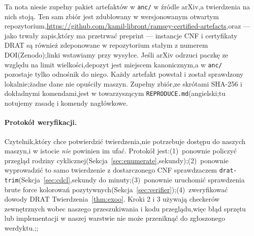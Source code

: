 \documentclass[11pt]{article}
\theoremstyle{definition}
\theoremstyle{plain}
\begin{document}
Ta nota niesie zupełny pakiet artefaktów w \texttt{anc/} w źródle arXiv,a twierdzenia na nich stoją. Ten sam zbiór jest zdublowany w wersjonowanym otwartym repozytorium,\url{https://github.com/kamil-libront/ramsey-certified-artefacts},oraz --- jako trwały zapis,który ma przetrwać preprint --- instancje CNF i certyfikaty DRAT są również zdeponowane w repozytorium stałym z numerem DOI(Zenodo);linki wstawiamy przy wysyłce. Jeśli arXiv odrzuci paczkę ze względu na limit wielkości,depozyt jest miejscem kanonicznym,a w \texttt{anc/} pozostaje tylko odnośnik do niego. Każdy artefakt powstał i został sprawdzony lokalnie;żadne dane nie opuściły maszyn. Zupełny zbiór,ze skrótami SHA-256 i dokładnymi komendami,jest w towarzyszącym \texttt{REPRODUCE.md}(angielski;tu notujemy zasadę i komendy nagłówkowe.



\paragraph{Protokół weryfikacji.} Czytelnik,który chce potwierdzić twierdzenia,nie potrzebuje dostępu do naszych maszyn,i w istocie \emph{nie} powinien im ufać. Protokół jest:(1)~ponownie policzyć przegląd rodziny cyklicznej(Sekcja~\ref{sec:enumerate},sekundy);(2)~ponownie wyprowadzić to samo twierdzenie z dostarczonego CNF sprawdzaczem \texttt{drat-trim}(Sekcja~\ref{sec:cdcl},sekundy do minuty;(3)~ponownie uruchomić sprawdzenia brute force kolorowań pozytywnych(Sekcja~\ref{sec:verifier});(4)~zweryfikować dowody DRAT Twierdzenia~\ref{thm:exoo}. Kroki 2 i 3 używają checkerów zewnętrznych wobec naszego przeszukiwania i kodu przeglądu,więc błąd sprzętu lub implementacji w naszej warstwie nie może przeniknąć do zgłoszonego werdyktu.;;
\end{document}
